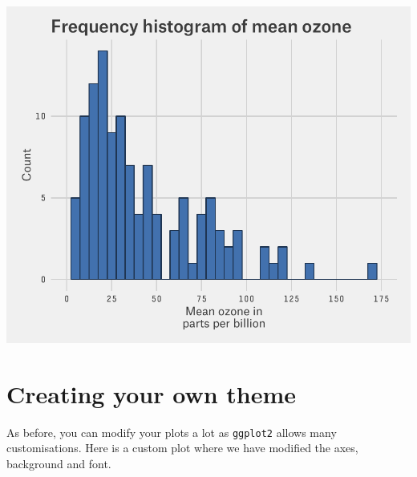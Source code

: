 \begin{center}\includegraphics[width=0.6\linewidth]{7_Histograms_pdf/histogram_16-1} \end{center}

\section{Creating your own theme}\label{creating-your-own-theme}

As before, you can modify your plots a lot as \texttt{ggplot2} allows
many customisations. Here is a custom plot where we have modified the
axes, background and font.

